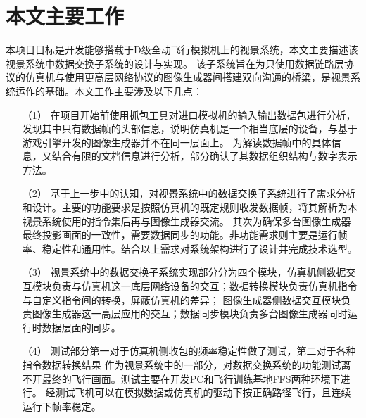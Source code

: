 \section{本文主要工作}
本项目目标是开发能够搭载于D级全动飞行模拟机上的视景系统，本文主要描述该视景系统中数据交换子系统的设计与实现。
该子系统旨在为只使用数据链路层协议的仿真机与使用更高层网络协议的图像生成器间搭建双向沟通的桥梁，是视景系统运作的基础。本文工作主要涉及以下几点：
\begin{itemize}
    \item [（1）]
    在项目开始前使用抓包工具对进口模拟机的输入输出数据包进行分析，发现其中只有数据帧的头部信息，说明仿真机是一个相当底层的设备，与基于游戏引擎开发的图像生成器并不在同一层面上。
    为解读数据帧中的具体信息，又结合有限的文档信息进行分析，部分确认了其数据组织结构与数字表示方法。
    \item [（2）]
    基于上一步中的认知，对视景系统中的数据交换子系统进行了需求分析和设计。主要的功能要求是按照仿真机的既定规则收发数据帧，将其解析为本视景系统使用的指令集后再与图像生成器交流。
    其次为确保多台图像生成器最终投影画面的一致性，需要数据同步的功能。非功能需求则主要是运行帧率、稳定性和通用性。结合以上需求对系统架构进行了设计并完成技术选型。
    \item [（3）]
    视景系统中的数据交换子系统实现部分分为四个模块，仿真机侧数据交互模块负责与仿真机这一底层网络设备的交互；数据转换模块负责仿真机指令与自定义指令间的转换，屏蔽仿真机的差异；
    图像生成器侧数据交互模块负责图像生成器这一高层应用的交互；数据同步模块负责多台图像生成器同时运行时数据层面的同步。
    \item [（4）]
    测试部分第一对于仿真机侧收包的频率稳定性做了测试，第二对于各种指令数据转换结果
    作为视景系统中的一部分，对数据交换系统的功能测试离不开最终的飞行画面。测试主要在开发PC和飞行训练基地FFS两种环境下进行。
    经测试飞机可以在模拟数据或仿真机的驱动下按正确路径飞行，且连续运行下帧率稳定。

\end{itemize}
